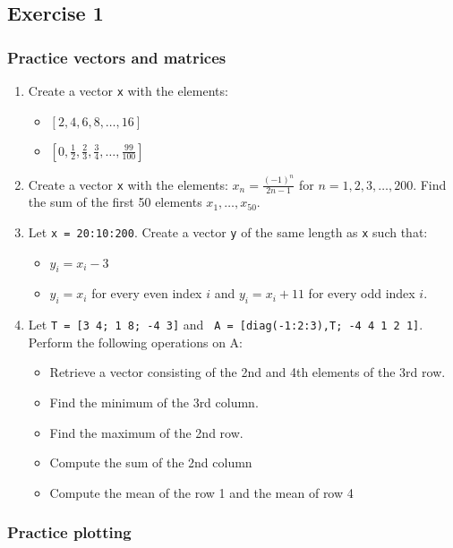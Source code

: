 \subsection*{Exercise 1}
\begin{frame}[fragile]
  \frametitle{Practice vectors and matrices}
  \begin{enumerate}
    \item Create a vector \lstinline$x$ with the elements:
    \begin{itemize}
      \item $[2,4,6,8,\ldots,16]$
      \item $[0, \frac{1}{2}, \frac{2}{3}, \frac{3}{4}, \ldots, \frac{99}{100}]$
    \end{itemize}
    \item Create a vector \lstinline$x$ with the elements: $x_n = \frac{(-1)^n}{2n-1}$ for $n=1,2,3,\ldots,200$. Find the sum of the first 50 elements $x_1,\ldots,x_{50}$.
    \item Let \lstinline$x = 20:10:200$. Create a vector \lstinline$y$ of the same length as \lstinline$x$ such that:
    \begin{itemize}
      \item $y_i = x_i - 3$
      \item $y_i = x_i$ for every even index $i$ and $y_i = x_i + 11$ for every odd index $i$.
    \end{itemize}
    \item Let \lstinline$T = [3 4; 1 8; -4 3]$ and \lstinline$ A = [diag(-1:2:3),T; -4 4 1 2 1]$. Perform
    the following operations on A:
    \begin{itemize}
      \item Retrieve a vector consisting of the 2nd and 4th elements of the 3rd row.
      \item Find the minimum of the 3rd column.
      \item Find the maximum of the 2nd row.
      \item Compute the sum of the 2nd column
      \item Compute the mean of the row 1 and the mean of row 4
    \end{itemize}
  \end{enumerate}
 \end{frame}

 \begin{frame}[fragile]
  \frametitle{Practice plotting}
 \end{frame}

